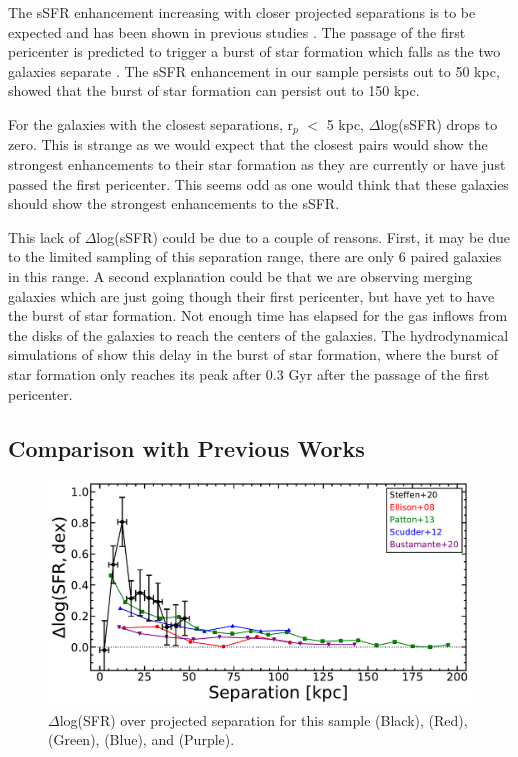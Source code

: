 \documentclass[iop,revtex4,twocolumn,apj,numberedappendix,appendixfloats]{emulateapj}
\begin{document}
The sSFR enhancement increasing with closer projected separations is to be expected and has been shown in previous studies \citep{Ellison:2008, Scudder:2012, Patton:2013}. The passage of the first pericenter is predicted to trigger a burst of star formation which falls as the two galaxies separate \citep{Scudder:2012}. The sSFR enhancement in our sample persists out to 50 kpc, \citet{Patton:2013} showed that the burst of star formation can persist out to 150 kpc. 

For the galaxies with the closest separations, r$_p$ $<$ 5 kpc, $\Delta$log(sSFR) drops to zero. This is strange as we would expect that the closest pairs would show the strongest enhancements to their star formation as they are currently or have just passed the first pericenter. This seems odd as one would think that these galaxies should show the strongest enhancements to the sSFR. 

This lack of $\Delta$log(sSFR) could be due to a couple of reasons. First, it may be due to the limited sampling of this separation range, there are only 6 paired galaxies in this range. A second explanation could be that we are observing merging galaxies which are just going though their first pericenter, but have yet to have the burst of star formation. Not enough time has elapsed for the gas inflows from the disks of the galaxies to reach the centers of the galaxies. The hydrodynamical simulations of \citet{Scudder:2012} show this delay in the burst of star formation, where the burst of star formation only reaches its peak after 0.3 Gyr after the passage of the first pericenter. 

\subsection{Comparison with Previous Works}

\begin{figure}
\centering
\includegraphics[width=\linewidth]{fig/nuc_sep.pdf}
\caption[]{$\Delta$log(SFR) over projected separation for this sample (Black), \citet{Ellison:2008} (Red), \citet{Patton:2013} (Green), \citet{Scudder:2012} (Blue), and \citet{Bustamante:2020} (Purple). }
\label{fig:nuc_sep}
\end{figure}
\end{document}
